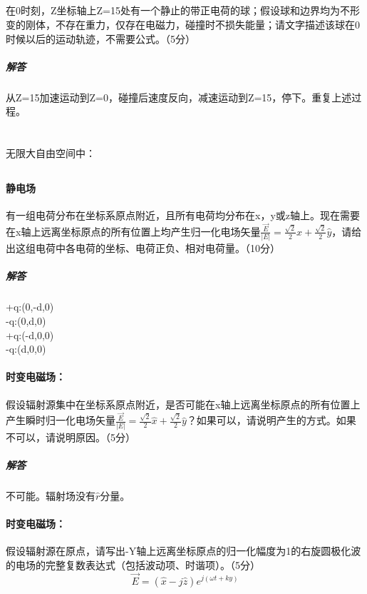 \documentclass[UTF8]{ctexart}
\begin{document}
\subsection{}
\paragraph{}
在0时刻，Z坐标轴上Z=15处有一个静止的带正电荷的球；假设球和边界均为不形变的刚体，不存在重力，仅存在电磁力，碰撞时不损失能量；请文字描述该球在0时候以后的运动轨迹，不需要公式。（5分）
\subparagraph{解答}
从Z=15加速运动到Z=0，碰撞后速度反向，减速运动到Z=15，停下。重复上述过程。
\section{}
\paragraph{}
无限大自由空间中：
\subsection{}
\paragraph{静电场}
有一组电荷分布在坐标系原点附近，且所有电荷均分布在x，y或z轴上。现在需要在x轴上远离坐标原点的所有位置上均产生归一化电场矢量$\frac{\vec E}{\lvert E\rvert}=\frac{\sqrt 2}{2}\hat x+\frac{\sqrt 2}{2}\hat y$，请给出这组电荷中各电荷的坐标、电荷正负、相对电荷量。（10分）
\subparagraph{解答}
+q:(0,-d,0)\\
-q:(0,d,0)\\
+q:(-d,0,0)\\
-q:(d,0,0)
\paragraph{时变电磁场：}
假设辐射源集中在坐标系原点附近，是否可能在x轴上远离坐标原点的所有位置上产生瞬时归一化电场矢量$\frac{\vec E}{\lvert E\rvert}=\frac{\sqrt 2}{2}\hat x+\frac{\sqrt 2}{2}\hat y$？如果可以，请说明产生的方式。如果不可以，请说明原因。（5分）
\subparagraph{解答}
不可能。辐射场没有$\hat r$分量。
\paragraph{时变电磁场：}
假设辐射源在原点，请写出-Y轴上远离坐标原点的归一化幅度为1的右旋圆极化波的电场的完整复数表达式（包括波动项、时谐项）。（5分）
\[\vec E=(\hat x-j\hat z)e^{j(\omega t+ky)}\]
\end{document}
